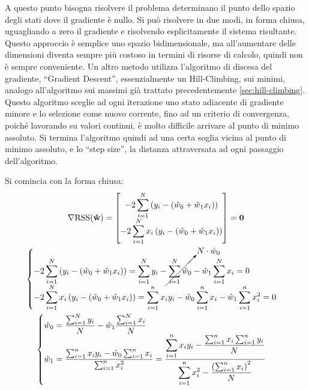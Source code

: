 \documentclass{article}
\numberwithin{equation}{subsection}
\newcommand{\vect}[1]{\boldsymbol{\mathbf{#1}}}
\begin{document}
A questo punto bisogna risolvere il problema determinano il punto dello spazio degli stati 
dove il gradiente è nullo. Si può risolvere in due modi, in forma chiusa, uguagliando a zero il gradiente e risolvendo esplicitamente il sistema risultante. Questo approccio è semplice uno spazio bidimensionale, ma all'aumentare delle dimensioni diventa sempre più costoso in termini di risorse di calcolo, quindi non è sempre conveniente. 
Un altro metodo utilizza l'algoritmo di discesa del gradiente, ``Gradient Descent'', essenzialmente un Hill-Climbing, sui minimi, analogo all'algoritmo sui massimi già trattato precedentemente \ref{sec:hill-climbing}. Questo algoritmo sceglie ad ogni iterazione uno stato adiacente di gradiente minore e lo selezione come nuovo corrente, fino ad un criterio di convergenza, poiché lavorando su valori continui, è molto difficile arrivare al punto di 
minimo assoluto. Si termina l'algoritmo quindi ad una certa soglia vicina al punto di minimo 
assoluto, e lo ``step size'', la distanza attraversata ad ogni passaggio dell'algoritmo. 

Si comincia con la forma chiusa:
\begin{gather*}
    \nabla\text{RSS}(\vect{\hat{w}})=\begin{bmatrix}
        \displaystyle-2\sum_{i=1}^N\left(y_i-(\hat{w}_0+\hat{w}_1x_i)\right)\\
        \displaystyle-2\sum_{i=1}^Nx_i\left(y_i-(\hat{w}_0+\hat{w}_1x_i)\right)
    \end{bmatrix}=\vect{0}\\
    \begin{cases}
        \displaystyle-2\sum_{i=1}^N\left(y_i-(\hat{w}_0+\hat{w}_1x_i)\right)=\sum_{i=1}^Ny_i-\cancelto{N\cdot\hat{w}_0}{\sum_{i=1}^N\hat{w}_0}-\hat{w}_1\sum_{i=1}^Nx_i=0\\
        \displaystyle-2\sum_{i=1}^Nx_i\left(y_i-(\hat{w}_0+\hat{w}_1x_i)\right)=\sum_{i=1}^nx_iy_i-\hat{w}_0\sum_{i=1}^nx_i-\hat{w}_1\sum_{i=1}^nx_i^2=0
    \end{cases}\\
    \begin{cases}
        \hat{w}_0=\displaystyle\frac{\sum_{i=1}^Ny_i}{N}-\hat{w}_1\frac{\sum_{i=1}^Nx_i}{N}\\
        \hat{w}_1=\displaystyle\frac{\sum_{i=1}^nx_iy_i-\hat{w}_0\sum_{i=1}^nx_i}{\sum_{i=1}^nx_i^2}=\frac{\displaystyle\sum_{i=1}^nx_iy_i-\frac{\sum_{i=1}^nx_i\sum_{i=1}^ny_i}{N}}{\displaystyle\sum_{i=1}^nx_i^2-\frac{\left(\sum_{i=1}^nx_i\right)^2}{N}}
    \end{cases}
\end{gather*}
\end{document}

